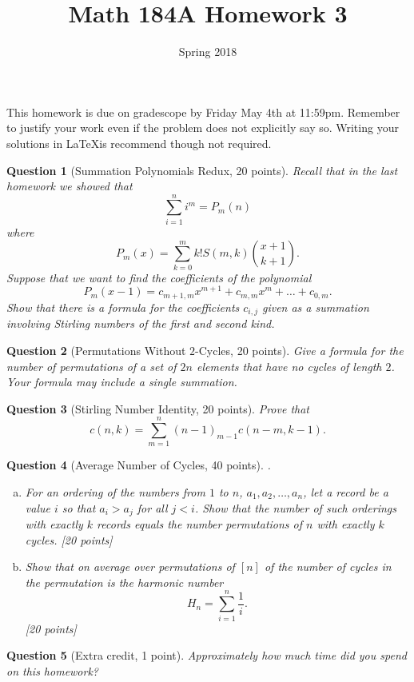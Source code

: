 \documentclass{article}
\title{Math 184A Homework 3}
\date{Spring 2018}
\newtheorem{ques}{Question}
\begin{document}
\maketitle

This homework is due on gradescope by Friday May 4th at 11:59pm. Remember to justify your work even if the problem does not explicitly say so. Writing your solutions in \LaTeX is recommend though not required.

\begin{ques}[Summation Polynomials Redux, 20 points]
Recall that in the last homework we showed that
$$
\sum_{i=1}^n i^m = P_m(n)
$$
where
$$
P_m(x) = \sum_{k=0}^m k!S(m,k)\binom{x+1}{k+1}.
$$
Suppose that we want to find the coefficients of the polynomial $$P_m(x-1)=c_{m+1,m}x^{m+1}+c_{m,m}x^m+\ldots+c_{0,m}.$$
Show that there is a formula for the coefficients $c_{i,j}$ given as a summation involving Stirling numbers of the first and second kind.
\end{ques}

\begin{ques}[Permutations Without $2$-Cycles, 20 points]
Give a formula for the number of permutations of a set of $2n$ elements that have no cycles of length $2$. Your formula may include a single summation.
\end{ques}

\begin{ques}[Stirling Number Identity, 20 points]
Prove that
$$
c(n,k) = \sum_{m=1}^n (n-1)_{m-1}c(n-m,k-1).
$$
\end{ques}

\begin{ques}[Average Number of Cycles, 40 points].
\begin{enumerate}[(a)]
\item For an ordering of the numbers from $1$ to $n$, $a_1,a_2,\ldots,a_n$, let a record be a value $i$ so that $a_i > a_j$ for all $j<i$. Show that the number of such orderings with exactly $k$ records equals the number permutations of $n$ with exactly $k$ cycles. [20 points]
\item Show that on average over permutations of $[n]$ of the number of cycles in the permutation is the harmonic number
$$
H_n = \sum_{i=1}^n \frac{1}{i}.
$$
[20 points]
\end{enumerate}
\end{ques}

\begin{ques}[Extra credit, 1 point]
Approximately how much time did you spend on this homework?
\end{ques}
\end{document}
